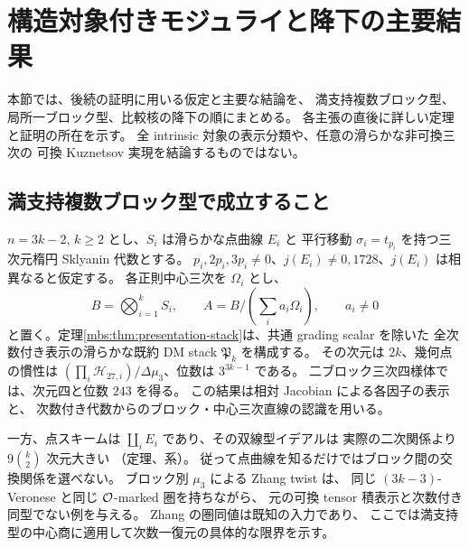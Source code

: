 \section{構造対象付きモジュライと降下の主要結果}
\label{sec:moduli-overview}

本節では、後続の証明に用いる仮定と主要な結論を、
満支持複数ブロック型、局所一ブロック型、比較核の降下の順にまとめる。
各主張の直後に詳しい定理と証明の所在を示す。
全 intrinsic 対象の表示分類や、任意の滑らかな非可換三次の
可換 Kuznetsov 実現を結論するものではない。

\subsection{満支持複数ブロック型で成立すること}
$n=3k-2$, $k\geq2$ とし、$S_i$ は滑らかな点曲線 $E_i$ と
平行移動 $\sigma_i=t_{p_i}$ を持つ三次元楕円 Sklyanin 代数とする。
$p_i,2p_i,3p_i\ne0$、$j(E_i)\ne0,1728$、$j(E_i)$ は相異なると仮定する。
各正則中心三次を $\Omega_i$ とし、
\[
 B=\bigotimes_{i=1}^k S_i,\qquad
 A=B/\left(\sum_i a_i\Omega_i\right),\qquad a_i\ne0
\]
と置く。定理\ref{mbs:thm:presentation-stack}は、共通 grading scalar を除いた
全次数付き表示の滑らかな既約 DM stack $\mathfrak P_k$ を構成する。
その次元は $2k$、幾何点の慣性は
$(\prod_i\mathcal H_{27,i})/\Delta\mu_3$、位数は $3^{3k-1}$ である。
二ブロック三次四様体では、次元四と位数 $243$ を得る。
この結果は相対 Jacobian による各因子の表示と、
次数付き代数からのブロック・中心三次直線の認識を用いる。

一方、点スキームは $\coprod_iE_i$ であり、その双線型イデアルは
実際の二次関係より $9\binom{k}{2}$ 次元大きい
（定理、系）。
従って点曲線を知るだけではブロック間の交換関係を選べない。
ブロック別 $\mu_3$ による Zhang twist は、
同じ $(3k-3)$-Veronese と同じ $\mathcal O$-marked 圏を持ちながら、
元の可換 tensor 積表示と次数付き同型でない例を与える。
Zhang の圏同値は既知の入力\cite{TBPZhangTwist}であり、
ここでは満支持型の中心商に適用して次数一復元の具体的な限界を示す。

